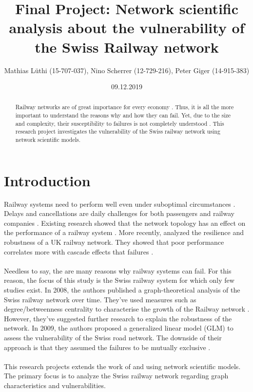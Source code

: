 \documentclass{Resources/netsci-project}
\begin{document}

\title{Final Project: Network scientific analysis about the vulnerability of the Swiss Railway network}
\author{Mathias Lüthi (15-707-037), Nino Scherrer (12-729-216), Peter Giger (14-915-383)}
\date{09.12.2019}

\maketitle

\begin{abstract}
Railway networks are of great importance for every economy \autocite{Resilience}. Thus, it is all the more important to understand the reasons why and how they can fail. Yet, due to the size and complexity, their susceptibility to failures is not completely understood \autocite{Resilience}. This research project investigates the vulnerability of the Swiss railway network using network scientific models.
\end{abstract}


\section{Introduction}
Railway systems need to perform well even under suboptimal circumstances \autocite{Resilience}. Delays and cancellations are daily challenges for both passengers and railway companies \autocite{Resilience}. Existing research showed that the network topology has an effect on the performance of a railway system \autocite{ComplexTopology}. More recently, \textcite{Resilience} analyzed the resilience and robustness of a UK railway network. They showed that poor performance correlates more with cascade effects that failures \autocite{Resilience}.
\\~\\
Needless to say, the are many reasons why railway systems can fail. For this reason, the focus of this study is the Swiss railway system for which only few studies exist. In 2008, the authors \textcite{GraphSwiss} published a graph-theoretical analysis of the Swiss railway network over time. They've used measures such as degree/betweenness centrality to characterise the growth of the Railway network \autocite{GraphSwiss}. However, they've suggested further research to explain the robustness of the network. In 2009, the authors \textcite{VulnerabilitySwiss} proposed a generalized linear model (GLM) to assess the vulnerability of the Swiss road network. The downside of their approach is that they assumed the failures to be mutually exclusive \autocite{VulnerabilitySwiss}. 
\\~\\
This research projects extends the work of \textcite{GraphSwiss} and \textcite{VulnerabilitySwiss} using network scientific models. The primary focus is to analyze the Swiss railway network regarding graph characteristics and vulnerabilities.
\end{document}
